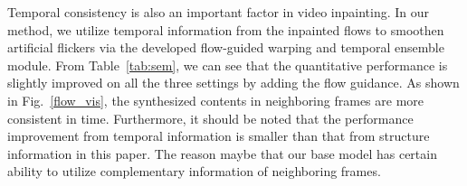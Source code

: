 Temporal consistency is also an important factor in video inpainting. 
In our method, we utilize temporal information from the inpainted flows to smoothen artificial flickers via the developed flow-guided warping and temporal ensemble module. 
From Table~\ref{tab:sem}, we can see that the quantitative performance is slightly improved on all the three settings by adding the flow guidance. 
%
As shown in Fig.~\ref{flow_vis}, the synthesized contents in neighboring frames are more consistent in time.
Furthermore, it should be noted that the performance improvement from temporal information is smaller than that from structure information in this paper.
The reason maybe that our base model has certain ability to utilize complementary information of neighboring frames.






